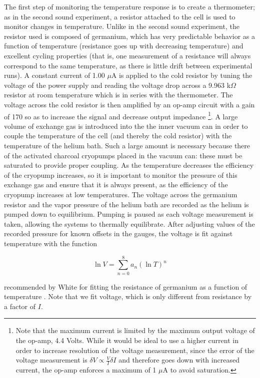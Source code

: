The first step of monitoring the temperature response is to create a thermometer; as in the second sound experiment, a resistor attached to the cell is used to monitor changes in temperature. Unlike in the second sound experiment, the resistor used is composed of germanium, which has very predictable behavior as a function of temperature (resistance goes up with decreasing temperature) and excellent cycling properties (that is, one measurement of a resistance will always correspond to the same temperature, as there is little drift between experimental runs). A constant current of 1.00 $\mu$A is applied to the cold resistor by tuning the voltage of the power supply and reading the voltage drop across a 9.963 k$\Omega$ resistor at room temperature which is in series with the thermometer. The voltage across the cold resistor is then amplified by an op-amp circuit with a gain of 170 so as to increase the signal and decrease output impedance \footnote{Note that the maximum current is limited by the maximum output voltage of the op-amp, 4.4 Volts. While it would be ideal to use a higher current in order to increase resolution of the voltage measurement, since the error of the voltage measurement is $\delta V \propto \frac{V}{I} \delta I$ and therefore goes down with increased current, the op-amp enforces a maximum of 1 $\mu$A to avoid saturation.}. A large volume of exchange gas is introduced into the the inner vacuum can in order to couple the temperature of the cell (and thereby the cold resistor) with the temperature of the helium bath. Such a large amount is necessary because there of the activated charcoal cryopumps placed in the vacuum can: these must be saturated to provide proper coupling. As the temperature decreases the efficiency of the cryopump increases, so it is important to monitor the pressure of this exchange gas and ensure that it is always present, as the efficiency of the cryopump increases at low temperatures. The voltage across the germanium resistor and the vapor pressure of the helium bath are recorded as the helium is pumped down to equilibrium. Pumping is paused as each voltage measurement is taken, allowing the systems to thermally equilibrate. After adjusting values of the recorded pressure for known offsets in the gauges, the voltage is fit against temperature with the function

\begin{equation}
\label{eq:fiteqn}
\ln{V} = \sum_{n=0}^{8} a_{n} (\ln{T})^{n}
\end{equation}

recommended by White for fitting the resistance of germanium as a function of temperature  \cite{white}. Note that we fit voltage, which is only different from resistance by a factor of $I$.

